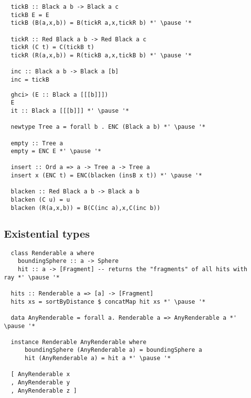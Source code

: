 \documentclass[aspectratio=43]{beamer}
\begin{document}
\begin{frame}[fragile]
 \begin{lstlisting}
  tickB :: Black a b -> Black a c
  tickB E = E
  tickB (B(a,x,b)) = B(tickR a,x,tickR b) *' \pause '*

  tickR :: Red Black a b -> Red Black a c
  tickR (C t) = C(tickB t)
  tickR (R(a,x,b)) = R(tickB a,x,tickB b) *' \pause '*
  
  inc :: Black a b -> Black a [b]
  inc = tickB
 \end{lstlisting}
\end{frame}

\begin{frame}[fragile]
 \begin{lstlisting}
  ghci> (E :: Black a [[[b]]])
  E
  it :: Black a [[[b]]] *' \pause '*
  
  newtype Tree a = forall b . ENC (Black a b) *' \pause '*
  
  empty :: Tree a
  empty = ENC E *' \pause '*

  insert :: Ord a => a -> Tree a -> Tree a
  insert x (ENC t) = ENC(blacken (insB x t)) *' \pause '*

  blacken :: Red Black a b -> Black a b
  blacken (C u) = u
  blacken (R(a,x,b)) = B(C(inc a),x,C(inc b)) 
 \end{lstlisting}
\end{frame}

\subsection{Existential types}

\begin{frame}[fragile]
 \begin{lstlisting}
  class Renderable a where
    boundingSphere :: a -> Sphere
    hit :: a -> [Fragment] -- returns the "fragments" of all hits with ray *' \pause '*
    
  hits :: Renderable a => [a] -> [Fragment]
  hits xs = sortByDistance $ concatMap hit xs *' \pause '*
  
  data AnyRenderable = forall a. Renderable a => AnyRenderable a *' \pause '*
 
  instance Renderable AnyRenderable where
      boundingSphere (AnyRenderable a) = boundingSphere a
      hit (AnyRenderable a) = hit a *' \pause '*
      
  [ AnyRenderable x
  , AnyRenderable y
  , AnyRenderable z ]
 \end{lstlisting}
\end{frame}
\end{document}
